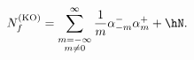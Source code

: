 \begin{equation}
%
N^{\rm (KO)}_{f} = \sum_{\stackrel{\scriptstyle m=-\infty}{m \neq 0}}^{\infty}
        \frac{1}{m} \alpha^{-}_{-m} \alpha^{+}_{m} + \hN.
\label{eq:Nko}
%
\end{equation}

